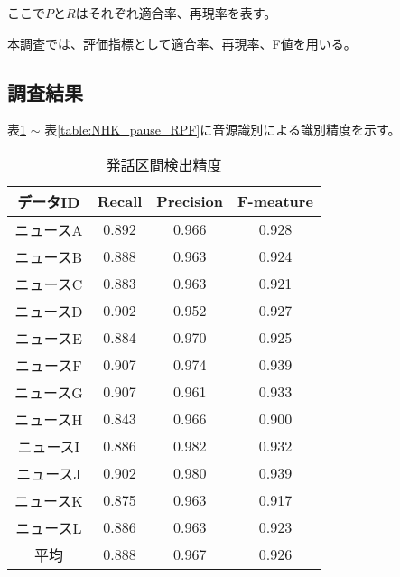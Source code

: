 ここで$P$と$R$はそれぞれ適合率、再現率を表す。\par
本調査では、評価指標として適合率、再現率、F値を用いる。

\subsection{調査結果}
表\ref{table:NHK_speach_RPF} $\sim$ 表\ref{table:NHK_pause_RPF}に音源識別による識別精度を示す。
\begin{table}[H]
  \begin{center}
    \caption{発話区間検出精度 \label{table:NHK_speach_RPF}}
    \begin{tabular}{|c||c|c|c|} \hline
データID & Recall & Precision & F-meature \\ \hline
ニュースA & 0.892 & 0.966 & 0.928 \\ \hline
ニュースB & 0.888 & 0.963 & 0.924 \\ \hline
ニュースC & 0.883 & 0.963 & 0.921 \\ \hline
ニュースD & 0.902 & 0.952 & 0.927 \\ \hline
ニュースE & 0.884 & 0.970 & 0.925 \\ \hline
ニュースF & 0.907 & 0.974 & 0.939 \\ \hline
ニュースG & 0.907 & 0.961 & 0.933 \\ \hline
ニュースH & 0.843 & 0.966 & 0.900 \\ \hline
ニュースI & 0.886 & 0.982 & 0.932 \\ \hline
ニュースJ & 0.902 & 0.980 & 0.939 \\ \hline
ニュースK & 0.875 & 0.963 & 0.917 \\ \hline
ニュースL & 0.886 & 0.963 & 0.923 \\ \hline
 平均 & 0.888 & 0.967 & 0.926 \\ \hline
    \end{tabular}
  \end{center}
\end{table}

